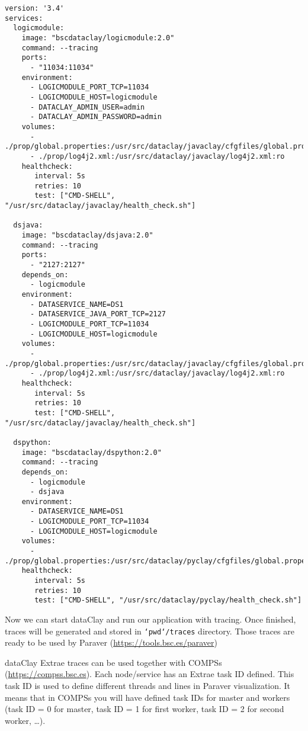\begin{tBox}
 \begin{lstlisting}[language=docker-compose-2, frame=none]
version: '3.4'
services:
  logicmodule:
    image: "bscdataclay/logicmodule:2.0"
    command: --tracing
    ports:
      - "11034:11034"
    environment:
      - LOGICMODULE_PORT_TCP=11034
      - LOGICMODULE_HOST=logicmodule
      - DATACLAY_ADMIN_USER=admin
      - DATACLAY_ADMIN_PASSWORD=admin
    volumes:
      - ./prop/global.properties:/usr/src/dataclay/javaclay/cfgfiles/global.properties:ro
      - ./prop/log4j2.xml:/usr/src/dataclay/javaclay/log4j2.xml:ro
    healthcheck:
       interval: 5s
       retries: 10
       test: ["CMD-SHELL", "/usr/src/dataclay/javaclay/health_check.sh"]
         
  dsjava:
    image: "bscdataclay/dsjava:2.0"
    command: --tracing
    ports:
      - "2127:2127"
    depends_on:
      - logicmodule
    environment:
      - DATASERVICE_NAME=DS1
      - DATASERVICE_JAVA_PORT_TCP=2127
      - LOGICMODULE_PORT_TCP=11034
      - LOGICMODULE_HOST=logicmodule
    volumes:
      - ./prop/global.properties:/usr/src/dataclay/javaclay/cfgfiles/global.properties:ro
      - ./prop/log4j2.xml:/usr/src/dataclay/javaclay/log4j2.xml:ro
    healthcheck:
       interval: 5s
       retries: 10
       test: ["CMD-SHELL", "/usr/src/dataclay/javaclay/health_check.sh"]
       
  dspython:
    image: "bscdataclay/dspython:2.0"
    command: --tracing
    depends_on:
      - logicmodule
      - dsjava
    environment:
      - DATASERVICE_NAME=DS1
      - LOGICMODULE_PORT_TCP=11034
      - LOGICMODULE_HOST=logicmodule
    volumes:
      - ./prop/global.properties:/usr/src/dataclay/pyclay/cfgfiles/global.properties:ro
    healthcheck:
       interval: 5s
       retries: 10
       test: ["CMD-SHELL", "/usr/src/dataclay/pyclay/health_check.sh"]
 \end{lstlisting}
\end{tBox}

Now we can start dataClay and run our application with tracing. Once finished, traces will be generated and stored in \texttt{`pwd`/traces} directory. 
Those traces are ready to be used by Paraver (\href {https://tools.bsc.es/paraver} {https://tools.bsc.es/paraver})

dataClay Extrae traces can be used together with COMPSs (\href {https://compss.bsc.es} {https://compss.bsc.es}). Each node/service has an Extrae task ID defined. This task ID is used to define different threads and lines in Paraver visualization. It means that in COMPSs you will have defined task IDs for master and workers (task ID = 0 for master, task ID = 1 for first worker, task ID = 2 for second worker, \ldots).

